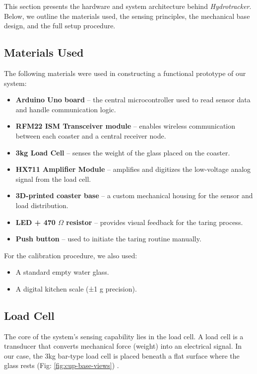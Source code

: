 This section presents the hardware and system architecture behind \textit{Hydrotracker}.  Below, we outline the materials used, the sensing principles, the mechanical base design, and the full setup procedure.

\subsection{Materials Used}
The following materials were used in constructing a functional prototype of our system:
\begin{itemize}
\item \textbf{Arduino Uno board} – the central microcontroller used to read sensor data and handle communication logic.
\item \textbf{RFM22 ISM Transceiver module} – enables wireless communication between each coaster and a central receiver node.
\item \textbf{3kg Load Cell} – senses the weight of the glass placed on the coaster.
\item \textbf{HX711 Amplifier Module} – amplifies and digitizes the low-voltage analog signal from the load cell.
\item \textbf{3D-printed coaster base} – a custom mechanical housing for the sensor and load distribution.
\item \textbf{LED + 470 $\Omega $ resistor} – provides visual feedback for the taring process.
\item \textbf{Push button} – used to initiate the taring routine manually.
\end{itemize}
For the calibration procedure, we also used:
\begin{itemize}
\item A standard empty water glass.
\item A digital kitchen scale (±1 g precision).
\end{itemize}

\subsection{Load Cell}
The core of the system’s sensing capability lies in the load cell. A load cell is a transducer that converts mechanical force (weight) into an electrical signal. In our case, the 3kg bar-type load cell is placed beneath a flat surface where the glass rests (Fig: \ref{fig:cup-base-views}) .

